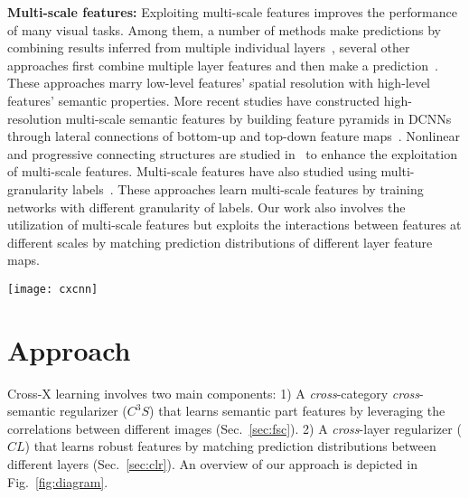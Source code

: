 \documentclass[10pt,twocolumn,letterpaper]{article}
\begin{document}
\textbf{Multi-scale features:} Exploiting multi-scale features improves the performance of many visual tasks. Among them, a number of methods make predictions by combining results inferred from multiple individual layers~\cite{ssd16szegedy,mscnn16cai}, several other approaches first combine multiple layer features and then make a prediction~\cite{fcn15darrell,hypercolumn15girshick,hypernet16kong}. These approaches marry low-level features' spatial resolution with high-level features' semantic properties. More recent studies have constructed high-resolution multi-scale semantic features by building feature pyramids in DCNNs through lateral connections of bottom-up and top-down feature maps~\cite{fpn17kaiming}. Nonlinear and progressive connecting structures are studied in~\cite{dla@darrell} to enhance the exploitation of multi-scale features. Multi-scale features have also studied using multi-granularity labels~\cite{hyperlabels@cvpr,multigranularity@iccv}. These approaches learn multi-scale features by training networks with different granularity of labels. Our work also involves the utilization of multi-scale features but exploits the interactions between features at different scales by matching prediction distributions of different layer feature maps.





\begin{figure*}[t]
\begin{center}
\texttt{[image: cxcnn]}
\end{center}
\caption{Overview of our approach. Our network outputs multiple feature maps by employing the OSME block. Two OSME blocks, each with two excitations, are depicted in the last two stages to illustrate our approach. Feature maps from stage $L-1$ (blue) and $L$ (red) are combined to generate the merged feature maps (orange). Top-left corner is a zoomed in display of the merging process of the merged feature maps. Feature maps are then aggregated to obtain the corresponding pooling features through GAP or GMP. The pooled features from the same stage are mutually constrained by the $C^3S$ regularizer and are simultaneously concatenated to feed into a fully-connected layer to generate logits. The logits are constrained through the $CL$ regularizer after conversion into class probabilities and are combined for classification. Best viewed in color.}
\label{fig:diagram}
\end{figure*}

\section{Approach}
\label{sec:models}
Cross-X learning involves two main components: 
1) A \textit{cross}-category \textit{cross}-semantic regularizer ($C^3S$) that learns semantic part features by leveraging the correlations between different images (Sec.~\ref{sec:fsc}).
2) A \textit{cross}-layer regularizer ($CL$) that learns robust  features by matching prediction distributions between different layers (Sec.~\ref{sec:clr}).
An overview of our approach is depicted in Fig.~\ref{fig:diagram}.
\end{document}
